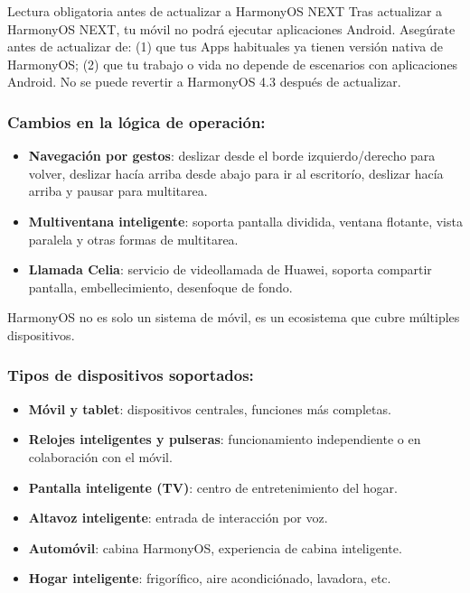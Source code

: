 \begin{tcbwarn}{Lectura obligatoria antes de actualizar a HarmonyOS NEXT}
Tras actualizar a HarmonyOS NEXT, tu móvil no podrá ejecutar aplicaciones Android. Asegúrate antes de actualizar de: (1) que tus Apps habituales ya tienen versión nativa de HarmonyOS; (2) que tu trabajo o vida no depende de escenarios con aplicaciones Android. No se puede revertir a HarmonyOS 4.3 después de actualizar.

\end{tcbwarn}

\subsubsection*{Cambios en la lógica de operación:}

\begin{itemize}
  \item \textbf{Navegación por gestos}: deslizar desde el borde izquierdo/derecho para volver, deslizar hacía arriba desde abajo para ir al escritorío, deslizar hacía arriba y pausar para multitarea.
  \item \textbf{Multiventana inteligente}: soporta pantalla dividida, ventana flotante, vista paralela y otras formas de multitarea.
  \item \textbf{Llamada Celia}: servicio de videollamada de Huawei, soporta compartir pantalla, embellecimiento, desenfoque de fondo.
\end{itemize}


HarmonyOS no es solo un sistema de móvil, es un ecosistema que cubre múltiples dispositivos.

\subsubsection*{Tipos de dispositivos soportados:}

\begin{itemize}
  \item \textbf{Móvil y tablet}: dispositivos centrales, funciones más completas.
  \item \textbf{Relojes inteligentes y pulseras}: funcionamiento independiente o en colaboración con el móvil.
  \item \textbf{Pantalla inteligente (TV)}: centro de entretenimiento del hogar.
  \item \textbf{Altavoz inteligente}: entrada de interacción por voz.
  \item \textbf{Automóvil}: cabina HarmonyOS, experiencia de cabina inteligente.
  \item \textbf{Hogar inteligente}: frigorífico, aire acondiciónado, lavadora, etc.
\end{itemize}


